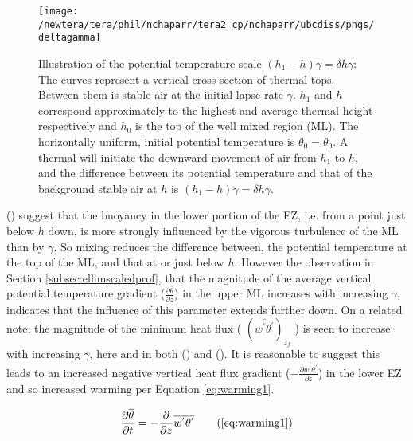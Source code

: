 \begin{figure}[htbp]
    \centering
    \texttt{[image: /newtera/tera/phil/nchaparr/tera2\_cp/nchaparr/ubcdiss/pngs/deltagamma]}
    \caption[Illustration of \acs{EZ} Potential Temperature Scale based on $\gamma$]{Illustration of the potential temperature scale $(h_{1}-h)\gamma = \delta h \gamma$: The curves represent a vertical cross-section of thermal tops.  Between them is stable air at the initial lapse rate $\gamma$. $h_{1}$ and $h$ correspond approximately to the highest and average thermal height respectively and $h_{0}$ is the top of the well mixed region (\acs{ML}).  The horizontally uniform, initial potential temperature is $\theta_{0} = \overline{\theta}_{0}$. A thermal will initiate the downward movement of air from $h_{1}$ to $h$, and the difference between its potential temperature and that of the background stable air at $h$ is $(h_{1}-h)\gamma = \delta h \gamma$.}
    \label{fig:deltagamma}   %
\end{figure}

\citeauthor{GarciaMellado} (\citeyear{GarciaMellado}) suggest that the buoyancy in the lower portion of the \acs{EZ}, i.e. from a point just below $h$ down, is more strongly influenced by the vigorous turbulence of the \acs{ML} than by $\gamma$.  So mixing reduces the difference between, the potential temperature at the top of the \acs{ML}, and that at or just below $h$.  However the observation in Section \ref{subsec:ellimscaledprof}, that the magnitude of the average vertical potential temperature gradient ($\frac{\partial \overline{\theta}}{\partial z}$) in the upper \acs{ML} increases with increasing $\gamma$, indicates that the influence of this parameter extends further down.  On a related note, the magnitude of the minimum heat flux ( $(\overline{w^{'}\theta^{'}})_{z_{f}}$ ) is seen to increase with increasing $\gamma$, here and in both \citeauthor{Sorbjan1} (\citeyear{Sorbjan1}) and \citeauthor{FedConzMir04} (\citeyear{FedConzMir04}).  It is reasonable to suggest this leads to an increased negative vertical heat flux gradient ($-\frac{\partial \overline{w^{'}\theta^{'}}}{\partial z}$) in the lower \acs{EZ} and so increased warming per Equation \ref{eq:warming1}.

\begin{equation}
\frac{\partial \overline{\theta}}{\partial t} = -\frac{\partial}{\partial z}\overline{w^{'}\theta^{'}} \tag{\ref{eq:warming1}}
\end{equation}

